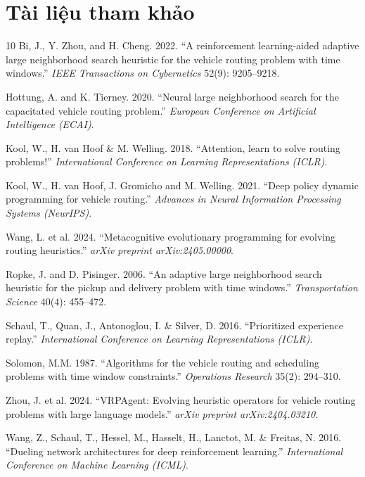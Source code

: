 \documentclass[13pt,a4paper]{extarticle}
\begin{document}
\section{Tài liệu tham khảo}

\begin{thebibliography}{10}
Bi, J., Y. Zhou, and H. Cheng. 2022. ``A reinforcement learning-aided adaptive large neighborhood search heuristic for the vehicle routing problem with time windows.'' \textit{IEEE Transactions on Cybernetics} 52(9): 9205--9218.

Hottung, A. and K. Tierney. 2020. ``Neural large neighborhood search for the capacitated vehicle routing problem.'' \textit{European Conference on Artificial Intelligence (ECAI)}.

Kool, W., H. van Hoof \& M. Welling. 2018. ``Attention, learn to solve routing problems!'' \textit{International Conference on Learning Representations (ICLR)}.

Kool, W., H. van Hoof, J. Gromicho and M. Welling. 2021. ``Deep policy dynamic programming for vehicle routing.'' \textit{Advances in Neural Information Processing Systems (NeurIPS)}.

Wang, L. et al. 2024. ``Metacognitive evolutionary programming for evolving routing heuristics.'' \textit{arXiv preprint arXiv:2405.00000}.

Ropke, J. and D. Pisinger. 2006. ``An adaptive large neighborhood search heuristic for the pickup and delivery problem with time windows.'' \textit{Transportation Science} 40(4): 455--472.

Schaul, T., Quan, J., Antonoglou, I. \& Silver, D. 2016. ``Prioritized experience replay.'' \textit{International Conference on Learning Representations (ICLR)}.

Solomon, M.M. 1987. ``Algorithms for the vehicle routing and scheduling problems with time window constraints.'' \textit{Operations Research} 35(2): 294--310.

Zhou, J. et al. 2024. ``VRPAgent: Evolving heuristic operators for vehicle routing problems with large language models.'' \textit{arXiv preprint arXiv:2404.03210}.

Wang, Z., Schaul, T., Hessel, M., Hasselt, H., Lanctot, M. \& Freitas, N. 2016. ``Dueling network architectures for deep reinforcement learning.'' \textit{International Conference on Machine Learning (ICML)}.
\end{thebibliography}

\clearpage
\end{document}
